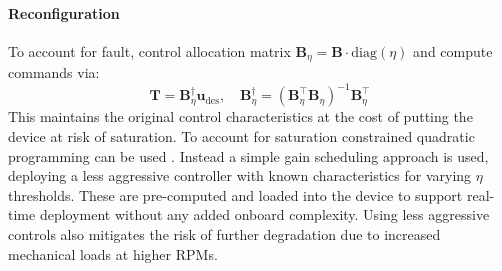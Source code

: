 \paragraph{Reconfiguration}
To account for fault, control allocation matrix $\mathbf{B}_\eta = \mathbf{B} \cdot \text{diag}(\eta)$ and compute commands via:
\begin{equation}
    \mathbf{T} = \mathbf{B}_\eta^\dagger \mathbf{u}_{\text{des}}, \quad \mathbf{B}_\eta^\dagger = (\mathbf{B}_\eta^\top \mathbf{B}_\eta)^{-1} \mathbf{B}_\eta^\top
\end{equation}
This maintains the original control characteristics at the cost of putting the device at risk of saturation. To account for saturation constrained quadratic programming can be used \cite{JOHANSEN2013}. Instead a simple gain scheduling approach is used, deploying a less aggressive controller with known characteristics for varying $\eta$ thresholds. These are pre-computed and loaded into the device to support real-time deployment without any added onboard complexity. Using less aggressive controls also mitigates the risk of further degradation due to increased mechanical loads at higher \gls{RPM}s.

